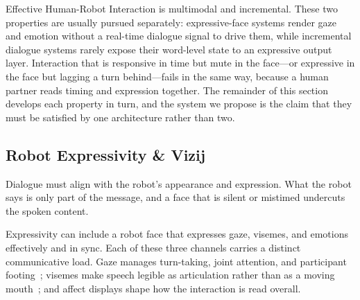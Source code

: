 \documentclass[conference]{IEEEtran}
\begin{document}
%
Effective Human-Robot Interaction is multimodal and incremental. These two
properties are usually pursued separately: expressive-face systems render
gaze and emotion without a real-time dialogue signal to drive them, while
incremental dialogue systems rarely expose their word-level state to an
expressive output layer. Interaction that is responsive in time but mute in
the face---or expressive in the face but lagging a turn behind---fails in the
same way, because a human partner reads timing and expression together. The
remainder of this section develops each property in turn, and the system we
propose is the claim that they must be satisfied by one architecture rather
than two.


\subsection{Robot Expressivity \& Vizij}

%
Dialogue must align with the robot's appearance and expression. What the
robot says is only part of the message, and a face that is silent or mistimed
undercuts the spoken content.

Expressivity can include a robot face that expresses gaze, visemes, and emotions effectively and in sync. Each of these three channels carries a
distinct communicative load. Gaze manages turn-taking, joint attention, and
participant footing~\cite{admoni2017social,mutlu2009footing}; visemes make
speech legible as articulation rather than as a moving
mouth~\cite{edwards2016jali}; and affect displays shape how the interaction is
read overall.
\end{document}
